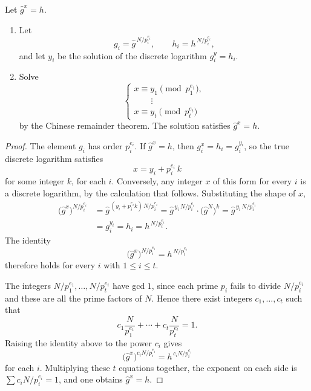 Let \(\hat g^{x}=h\).
\begin{enumerate}[leftmargin=1.6em]
    \item Let
    \[
        g_i=\hat g^{\,N/p_i^{e_i}},
        \qquad
        h_i=h^{\,N/p_i^{e_i}},
    \]
    and let \(y_i\) be the solution of the discrete logarithm
    \(g_i^{y}=h_i\).
    \item Solve
    \[
        \begin{cases}
            x\equiv y_1\pmod{p_1^{e_1}},\\
            \qquad\vdots\\
            x\equiv y_t\pmod{p_t^{e_t}}
        \end{cases}
    \]
    by the Chinese remainder theorem. The solution satisfies
    \(\hat g^{x}=h\).
\end{enumerate}


\begin{proof}
The element \(g_i\) has order \(p_i^{e_i}\). If \(\hat g^{x}=h\), then
\(g_i^{x}=h_i=g_i^{y_i}\), so the true discrete logarithm satisfies
\[
    x = y_i + p_i^{e_i}\,k
\]
for some integer \(k\), for each \(i\). Conversely, any integer \(x\) of
this form for every \(i\) is a discrete logarithm, by the calculation
that follows. Substituting the shape of \(x\),
\begin{align*}
    \bigl(\hat g^{x}\bigr)^{N/p_i^{e_i}}
    &= \hat g^{\,(y_i+p_i^{e_i}k)\,N/p_i^{e_i}}
     = \hat g^{\,y_i\,N/p_i^{e_i}}
       \cdot\bigl(\hat g^{N}\bigr)^{k}
     = \hat g^{\,y_i\,N/p_i^{e_i}}\\
    &= g_i^{y_i}
     = h_i
     = h^{\,N/p_i^{e_i}}.
\end{align*}
The identity
\[
    \bigl(\hat g^{x}\bigr)^{N/p_i^{e_i}} = h^{\,N/p_i^{e_i}}
\]
therefore holds for every \(i\) with \(1\le i\le t\).

The integers \(N/p_1^{e_1},\ldots,N/p_t^{e_t}\) have gcd \(1\), since
each prime \(p_i\) fails to divide \(N/p_i^{e_i}\) and these are all the
prime factors of \(N\). Hence there exist integers \(c_1,\ldots,c_t\)
such that
\[
    c_1\frac{N}{p_1^{e_1}} + \cdots + c_t\frac{N}{p_t^{e_t}} = 1.
\]
Raising the identity above to the power \(c_i\) gives
\[
    \bigl(\hat g^{x}\bigr)^{c_i N/p_i^{e_i}}
    = h^{\,c_i N/p_i^{e_i}}
\]
for each \(i\). Multiplying these \(t\) equations together, the exponent
on each side is \(\sum c_i N/p_i^{e_i}=1\), and one obtains
\(\hat g^{x}=h\).
\end{proof}

